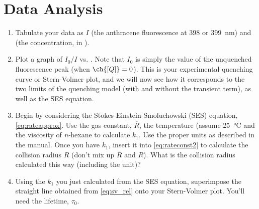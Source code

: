 \section{Data Analysis} %
\label{sec:data_analysis}
\begin{enumerate}
	\item Tabulate your data as \( I \) (the anthracene fluorescence at \num{398} or \SI{399}{\nm}) and \ch{[Q]} (the  concentration, in \si{\Molar}).
	\item Plot a graph of  \( I_0/I \)  vs. \ch{[Q]}. 
	Note that \( I_0 \) is simply the value of the unquenched fluorescence peak (when \( \ch{[Q]} = 0 \)). 
	This is your experimental quenching curve or Stern-Volmer plot, and we will now see how it corresponds to the two limits of the quenching model (with and without the transient term), as well as the SES equation.
	\item Begin by considering the Stokes-Einstein-Smoluchowski (SES) equation, \cref{eq:rateapprox}. 
	Use the gas constant, \( \overline{R} \), the temperature (assume \SI{25}{\celsius} and the viscosity of \emph{n-}hexane to calculate \( k_1 \). 
	Use the proper units as described in the manual. 
  Once you have \( k_1 \), insert it into \cref{eq:rateconst2} to calculate the collision radius \( R \) (don’t mix up \( \overline{R} \) and \( R \)). 
	What is the collision radius calculated this way (including the unit)?
	\item Using the \( k_1 \) you just calculated from the SES equation, superimpose the straight line obtained from \cref{eq:sv_rel} onto your Stern-Volmer plot. You’ll need the lifetime, \( \tau_0 \).\sidenote{
}
\end{enumerate}
